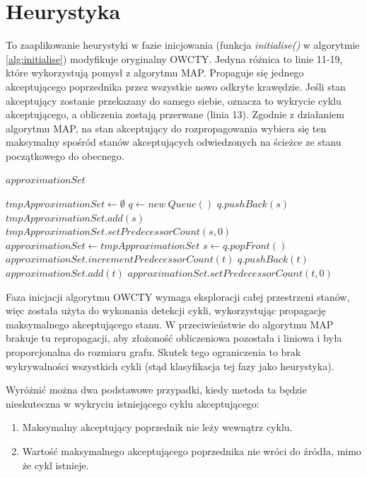 \section{Heurystyka} \label{heuristic}

To zaaplikowanie heurystyki w fazie inicjowania (funkcja \textit{initialise()} w algorytmie \ref{alg:initialise}) modyfikuje oryginalny OWCTY.
Jedyna różnica to linie 11-19, które wykorzystują pomysł z algorytmu MAP.
Propaguje się jednego akceptującego poprzednika przez wszystkie nowo odkryte krawędzie.
Jeśli stan akceptujący zostanie przekazany do samego siebie, oznacza to wykrycie cyklu akceptującego, a obliczenia zostają przerwane (linia 13).
Zgodnie z działaniem algorytmu MAP, na stan akceptujący do rozpropagowania wybiera się ten maksymalny spośród stanów akceptujących odwiedzonych na ścieżce ze stanu początkowego do obecnego.

\begin{algorithm}
\caption{$ eliminateNoAccepting(approximationSet) $}
\label{alg:eliminateNoAccepting}
\begin{algorithmic}[1]
\REQUIRE $ approximationSet $

\STATE $ tmpApproximationSet \leftarrow \emptyset $
\STATE $ q \leftarrow new\ Queue() $
    \STATE $ q.pushBack(s) $
    \STATE $ tmpApproximationSet.add(s) $
    \STATE $ tmpApproximationSet.setPredecessorCount(s,0) $
  \ENDIF
\ENDFOR
\STATE $ approximationSet \leftarrow tmpApproximationSet $
  \STATE $ s \leftarrow q.popFront() $
      \STATE $ approximationSet.incrementPredecessorCount(t) $
    \ELSE
      \STATE $ q.pushBack(t) $
      \STATE $ approximationSet.add(t) $
      \STATE $ approximationSet.setPredecessorCount(t,0) $
    \ENDIF
  \ENDFOR
\ENDWHILE
\end{algorithmic}
\end{algorithm}

Faza inicjacji algorytmu OWCTY wymaga eksploracji całej przestrzeni stanów, więc została użyta do wykonania detekcji cykli, wykorzystując propagację maksymalnego akceptującego stanu.
W przeciwieństwie do algorytmu MAP brakuje tu repropagacji, aby złożoność obliczeniowa pozostała i liniowa i była proporcjonalna do rozmiaru grafu.
Skutek tego ograniczenia to brak wykrywalności wszystkich cykli (stąd klasyfikacja tej fazy jako heurystyka).

\noindent
Wyróżnić można dwa podstawowe przypadki, kiedy metoda ta będzie nieskuteczna w wykryciu istniejącego cyklu akceptującego:
\begin{enumerate}
  \item Maksymalny akceptujący poprzednik nie leży wewnątrz cyklu.
  \item Wartość maksymalnego akceptującego poprzednika nie wróci do źródła, mimo że cykl istnieje.
\end{enumerate}

